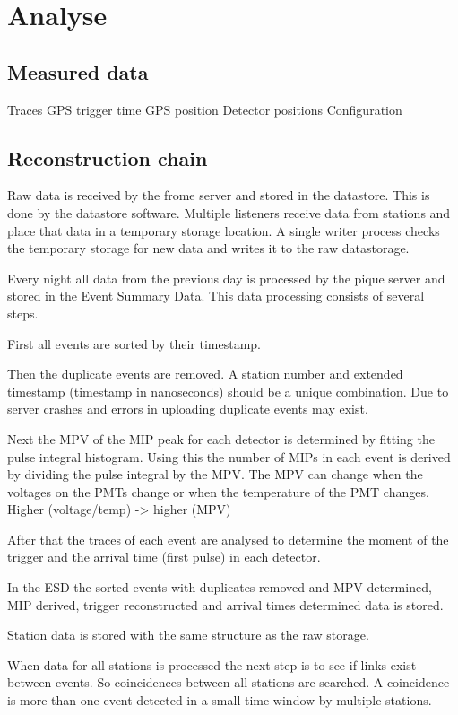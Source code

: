 \chapter{Analyse}
\label{ch:analyse}


\section{Measured data}

Traces
GPS trigger time
GPS position
Detector positions
Configuration


\section{Reconstruction chain}

Raw data is received by the frome server and stored in the \hisparc
datastore. This is done by the datastore software. Multiple listeners
receive data from stations and place that data in a temporary storage
location. A single writer process checks the temporary storage for new
data and writes it to the raw datastorage.

Every night all data from the previous day is processed by the pique
server and stored in the Event Summary Data. This data processing
consists of several steps.

First all events are sorted by their timestamp.

Then the duplicate events are removed. A station number and
extended timestamp (timestamp in nanoseconds) should be a unique
combination. Due to server crashes and errors in uploading duplicate
events may exist.

Next the MPV of the MIP peak for each detector is determined by fitting
the pulse integral histogram. Using this the number of MIPs in each
event is derived by dividing the pulse integral by the MPV. The MPV can
change when the voltages on the PMTs change or when the temperature of
the PMT changes. Higher (voltage/temp) -> higher (MPV)

After that the traces of each event are analysed to determine the moment
of the trigger and the arrival time (first pulse) in each detector.

In the ESD the sorted events with duplicates removed and MPV determined,
MIP derived, trigger reconstructed and arrival times determined data is
stored.

Station data is stored with the same structure as the raw storage.

When data for all stations is processed the next step is to see if links
exist between events. So coincidences between all stations are searched.
A coincidence is more than one event detected in a small time window by
multiple stations.

